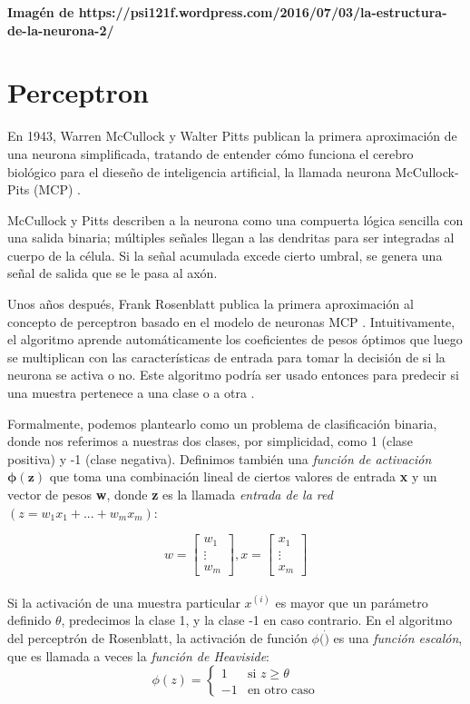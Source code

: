 \textbf{Imagén de https://psi121f.wordpress.com/2016/07/03/la-estructura-de-la-neurona-2/}



\section{Perceptron}
En 1943, Warren McCullock y Walter Pitts publican la primera aproximación de una
neurona simplificada, tratando de entender cómo funciona el cerebro biológico para
el dieseño de inteligencia artificial, la llamada neurona McCullock-Pits (MCP) \cite{mcp}.

McCullock y Pitts describen a la neurona como una compuerta lógica sencilla con una
salida binaria; múltiples señales llegan a las dendritas para ser integradas al cuerpo
de la célula. Si la señal acumulada excede cierto umbral, se genera una señal de salida
que se le pasa al axón.

Unos años después, Frank Rosenblatt publica la primera aproximación al concepto de
perceptron basado en el modelo de neuronas MCP \cite{rosenblatt}. Intuitivamente, el algoritmo
aprende automáticamente los coeficientes de pesos óptimos que luego se multiplican
con las características de entrada para tomar la decisión de si la neurona se activa
o no. Este algoritmo podría ser usado entonces para predecir si una muestra pertenece
a una clase o a otra \cite{python}.

Formalmente, podemos plantearlo como un problema de clasificación binaria, donde nos
referimos a nuestras dos clases, por simplicidad, como 1 (clase positiva) y -1
(clase negativa). Definimos también una \textit{función de activación $\mathbf{\phi (z)}$}
que toma una combinación lineal de ciertos valores de entrada \textbf{x} y un
vector de pesos \textbf{w}, donde \textbf{z} es la llamada \textit{entrada de la red}
$(z = w_1x_1 + ... + w_mx_m)$:

\begin{equation*}
w=
    \begin{bmatrix}
        w_1 \\
        \vdots \\
        w_m
    \end{bmatrix}
    , x=
    \begin{bmatrix}
      x_1 \\
      \vdots \\
      x_m
    \end{bmatrix}
\end{equation*}
\\
Si la activación de una muestra particular $x^{(i)}$ es mayor que un parámetro definido
$\theta$, predecimos la clase 1, y la clase -1 en caso contrario. En el algoritmo
del perceptrón de Rosenblatt, la activación de función $\phi (\dot)$ es una \textit{función escalón},
que es llamada a veces la \textit{función de Heaviside}:
\begin{equation*}
  \phi(z)= \left\{ \begin{array} {rl}
    1 & \text{si } z \geq \theta \\
    -1 & \text{en otro caso} \end{array} \right.
\end{equation*}

